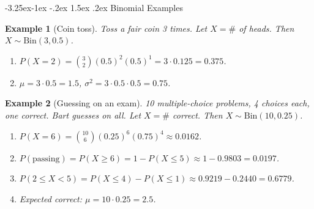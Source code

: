 \documentclass{article}
\makeatletter
\newtheorem{example}{Example}[section]
\theoremstyle{remark}
\newlength{\subsecindent}
\renewcommand\subsection{\@startsection{subsection}{2}{\subsecindent}%
  {-3.25ex\@plus -1ex \@minus -.2ex}%
  {1.5ex \@plus .2ex}%
  {\normalfont\large\bfseries}}
\newenvironment{sub}{%
  \begin{list}{}{%
    \setlength{\leftmargin}{4em}%
    \setlength{\rightmargin}{0pt}%
    \setlength{\topsep}{0pt}%
    \setlength{\partopsep}{0pt}%
    \setlength{\parsep}{\parskip}%
    \setlength{\itemsep}{\parskip}%
  }\item\relax
}{\end{list}}
\makeatother
\begin{document}
\subsection{Binomial Examples}
\begin{sub}

\begin{example}[Coin toss]
  \label{ex:binom-coin}
  Toss a fair coin 3 times. Let $X = \#$ of heads. Then $X \sim \text{Bin}(3, 0.5)$.
  \begin{enumerate}
    \item $P(X = 2) = \binom{3}{2}(0.5)^2(0.5)^1 = 3 \cdot 0.125 = 0.375$.
    \item $\mu = 3 \cdot 0.5 = 1.5$, \; $\sigma^2 = 3 \cdot 0.5 \cdot 0.5 = 0.75$.
  \end{enumerate}
\end{example}

\begin{example}[Guessing on an exam]
  \label{ex:binom-exam}
  10 multiple-choice problems, 4 choices each, one correct. Bart guesses on all.
  Let $X = \#$ correct. Then $X \sim \text{Bin}(10, 0.25)$.
  \begin{enumerate}
    \item $P(X = 6) = \binom{10}{6}(0.25)^6(0.75)^4 \approx 0.0162$.
    \item $P(\text{passing}) = P(X \ge 6) = 1 - P(X \le 5) \approx 1 - 0.9803 = 0.0197$.
    \item $P(2 \le X < 5) = P(X \le 4) - P(X \le 1) \approx 0.9219 - 0.2440 = 0.6779$.
    \item Expected correct: $\mu = 10 \cdot 0.25 = 2.5$.
  \end{enumerate}
\end{example}

\end{sub}
\end{document}

